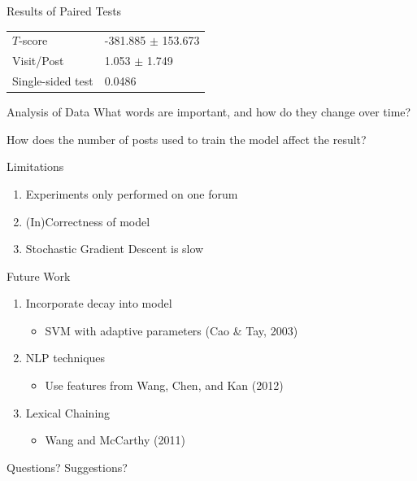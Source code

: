 \documentclass[12pt]{../presentation}
\begin{document}
\begin{frame}{Results of Paired Tests}
	\begin{center}\begin{tabular}{l l}
		$T$-score 	 & -381.885 $\pm$ 153.673\\
		Visit/Post 	 & 1.053 $\pm$ 1.749	   \\
\rowcolor{green}
		Single-sided test & 0.0486 \\
	\end{tabular}\end{center}
\end{frame}

\begin{frame}{Analysis of Data}
What words are important, and how do they change over time?

How does the number of posts used to train the model affect the result?
\end{frame}


\begin{frame}{Limitations}
	\begin{enumerate}
		\item Experiments only performed on one forum
		\item (In)Correctness of model
		\item Stochastic Gradient Descent is slow
	\end{enumerate}
\end{frame}

\begin{frame}{Future Work}
	\begin{enumerate}
		\item Incorporate decay into model
			\begin{itemize}
				\item SVM with adaptive parameters (Cao \& Tay, 2003)
			\end{itemize} 
		\item NLP techniques
			\begin{itemize}
				\item Use features from Wang, Chen, and Kan (2012)
			\end{itemize} 
		\item Lexical Chaining
			\begin{itemize}
				\item Wang and McCarthy (2011)
			\end{itemize}
	\end{enumerate}
\end{frame}


\begin{frame}
	\begin{center}
		\large 
		Questions? Suggestions?
	\end{center}
\end{frame}
\end{document}
